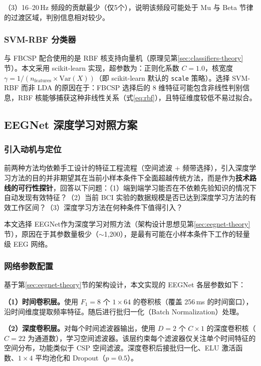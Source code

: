 （3）16--20\,Hz 频段的贡献最少（仅5个），说明该频段可能处于 Mu 与 Beta 节律的过渡区域，判别信息相对较少。

\subsubsection{SVM-RBF 分类器}

与 FBCSP 配合使用的是 RBF 核支持向量机（原理见第\ref{sec:classifiers-theory}节）。本文采用 scikit-learn 实现，超参数为：正则化系数 $C = 1.0$，核宽度 $\gamma = 1 / (n_{\text{features}} \times \mathrm{Var}(X))$（即 scikit-learn 默认的 \texttt{scale} 策略）。选择 SVM-RBF 而非 LDA 的原因在于：FBCSP 选择后的 8 维特征可能包含非线性判别信息，RBF 核能够捕获这种非线性关系（式\ref{eq:rbf}），且特征维度较低不易过拟合。

\subsection{EEGNet 深度学习对照方案}

\subsubsection{引入动机与定位}

前两种方法均依赖手工设计的特征工程流程（空间滤波 + 频带选择），引入深度学习方法的目的并非期望其在当前小样本条件下全面超越传统方法，而是作为\textbf{技术路线的可行性探针}，回答以下问题：（1）端到端学习能否在不依赖先验知识的情况下自动发现有效特征？（2）当前 BCI 实验的数据规模是否已达到深度学习方法的有效工作区间？（3）深度学习方法在何种条件下值得引入？

本文选择 EEGNet作为深度学习对照方法（架构设计思想见第\ref{sec:eegnet-theory}节），原因在于其参数量极少（$\sim$1,200），是最有可能在小样本条件下工作的轻量级 EEG 网络。

\subsubsection{网络参数配置}

基于第\ref{sec:eegnet-theory}节的架构设计，本文实现的 EEGNet 各层参数如下：

\textbf{（1）时间卷积层。}使用 $F_1 = 8$ 个 $1 \times 64$ 的卷积核（覆盖 256\,ms 的时间窗口），沿时间维度提取频率特征。随后进行批归一化（Batch Normalization）处理。

\textbf{（2）深度卷积层。}对每个时间滤波器输出，使用 $D = 2$ 个 $C \times 1$ 的深度卷积核（$C = 22$ 为通道数），学习空间滤波器。该层约束每个滤波器仅关注单个时间特征的空间分布，功能类似于 CSP 空间滤波。深度卷积后接批归一化、ELU 激活函数、$1 \times 4$ 平均池化和 Dropout（$p = 0.5$）。


